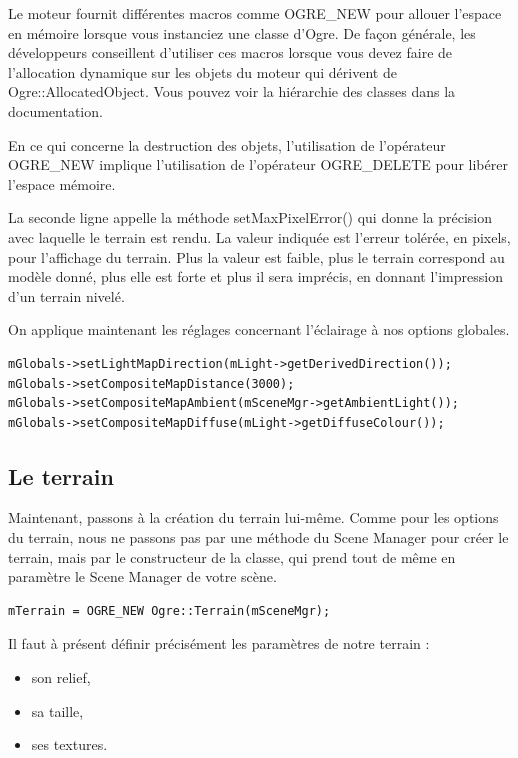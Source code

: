Le moteur fournit différentes macros comme OGRE\_NEW pour allouer l'espace en mémoire lorsque vous instanciez une classe d'Ogre. De fa\c{c}on générale, les développeurs conseillent d'utiliser ces macros lorsque vous devez faire de l'allocation dynamique sur les objets du moteur qui dérivent de Ogre::AllocatedObject. Vous pouvez voir la hiérarchie des classes dans la documentation.

En ce qui concerne la destruction des objets, l'utilisation de l'opérateur OGRE\_NEW implique l'utilisation de l'opérateur OGRE\_DELETE pour libérer l'espace mémoire.

La seconde ligne appelle la méthode setMaxPixelError() qui donne la précision avec laquelle le terrain est rendu. La valeur indiquée est l'erreur tolérée, en pixels, pour l'affichage du terrain. Plus la valeur est faible, plus le terrain correspond au modèle donné, plus elle est forte et plus il sera imprécis, en donnant l'impression d'un terrain nivelé.

On applique maintenant les réglages concernant l'éclairage à nos options globales.

\begin{lstlisting}[caption={Application des réglages}]
mGlobals->setLightMapDirection(mLight->getDerivedDirection());
mGlobals->setCompositeMapDistance(3000);
mGlobals->setCompositeMapAmbient(mSceneMgr->getAmbientLight());
mGlobals->setCompositeMapDiffuse(mLight->getDiffuseColour());
\end{lstlisting}




\subsection{Le terrain}


Maintenant, passons à la création du terrain lui-même. Comme pour les options du terrain, nous ne passons pas par une méthode du Scene Manager pour créer le terrain, mais par le constructeur de la classe, qui prend tout de même en paramètre le Scene Manager de votre scène.

\begin{lstlisting}[caption={Création du terrain}]
mTerrain = OGRE_NEW Ogre::Terrain(mSceneMgr);
\end{lstlisting}

Il faut à présent définir précisément les paramètres de notre terrain :

\begin{itemize}
\item son relief, 
\item sa taille,
\item ses textures.
\end{itemize}


